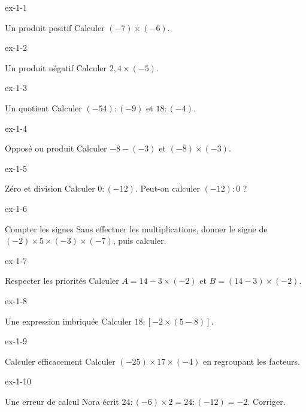 \clearpage{}
\begin{blocLivre}{ex-1-1}\begin{exercice}[1]{Un produit positif}
Calculer $(-7)\times(-6)$.
\end{exercice}\end{blocLivre}
\begin{blocLivre}{ex-1-2}\begin{exercice}[1]{Un produit négatif}
Calculer $2{,}4\times(-5)$.
\end{exercice}\end{blocLivre}
\begin{blocLivre}{ex-1-3}\begin{exercice}[1]{Un quotient}
Calculer $(-54):(-9)$ et $18:(-4)$.
\end{exercice}\end{blocLivre}
\begin{blocLivre}{ex-1-4}\begin{exercice}[1]{Opposé ou produit}
Calculer $-8-(-3)$ et $(-8)\times(-3)$.
\end{exercice}\end{blocLivre}
\begin{blocLivre}{ex-1-5}\begin{exercice}[1]{Zéro et division}
Calculer $0:(-12)$. Peut-on calculer $(-12):0$ ?
\end{exercice}\end{blocLivre}

\begin{blocLivre}{ex-1-6}\begin{exercice}[2]{Compter les signes}
Sans effectuer les multiplications, donner le signe de $(-2)\times5\times(-3)\times(-7)$, puis calculer.
\end{exercice}\end{blocLivre}
\begin{blocLivre}{ex-1-7}\begin{exercice}[2]{Respecter les priorités}
Calculer $A=14-3\times(-2)$ et $B=(14-3)\times(-2)$.
\end{exercice}\end{blocLivre}
\begin{blocLivre}{ex-1-8}\begin{exercice}[2]{Une expression imbriquée}
Calculer $18:[-2\times(5-8)]$.
\end{exercice}\end{blocLivre}
\begin{blocLivre}{ex-1-9}\begin{exercice}[2]{Calculer efficacement}
Calculer $(-25)\times17\times(-4)$ en regroupant les facteurs.
\end{exercice}\end{blocLivre}
\begin{blocLivre}{ex-1-10}\begin{exercice}[2]{Une erreur de calcul}
Nora écrit $24:(-6)\times2=24:(-12)=-2$. Corriger.
\end{exercice}\end{blocLivre}

